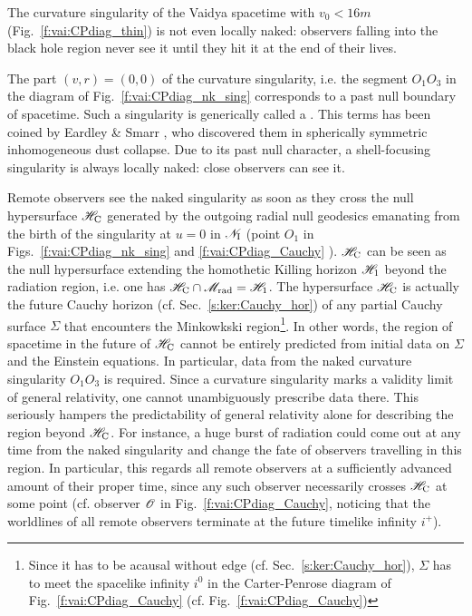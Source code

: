 \begin{remark}
The curvature singularity of the Vaidya spacetime with $v_0 < 16 m$ (Fig.~\ref{f:vai:CPdiag_thin})
is not even locally naked: observers falling into the black hole region never see
it until they hit it at the end of their lives.
\end{remark}

The part  $(v, r) = (0, 0)$ of the curvature singularity, i.e. the segment $O_1 O_3$ in
the diagram of Fig.~\ref{f:vai:CPdiag_nk_sing} corresponds to a past null boundary of
spacetime.
Such a singularity is generically called a
. This terms has been coined by Eardley \& Smarr \cite{EardlS79}, who discovered them
in spherically symmetric inhomogeneous dust collapse.
Due to its past null character, a shell-focusing singularity is always locally naked: close observers can see it.



Remote observers see the naked singularity as soon as they cross
the null hypersurface $\mathscr{H}_{\rm C}$ generated by the outgoing radial null geodesics
emanating from the birth of the singularity at $u=0$ in $\mathscr{N}_{\rm I}$
(point $O_1$ in Figs.~\ref{f:vai:CPdiag_nk_sing} and \ref{f:vai:CPdiag_Cauchy} ).
$\mathscr{H}_{\rm C}$ can be seen as the null hypersurface extending the
homothetic Killing horizon $\mathscr{H}_1$ beyond the radiation region, i.e. one has
$\mathscr{H}_{\rm C} \cap \mathscr{M}_{\rm rad} = \mathscr{H}_1$.
The hypersurface $\mathscr{H}_{\rm C}$ is actually the future Cauchy horizon (cf. Sec.~\ref{s:ker:Cauchy_hor})
of any partial Cauchy surface $\Sigma$ that encounters the Minkowkski region\footnote{Since it
has to be acausal without edge (cf. Sec.~\ref{s:ker:Cauchy_hor}), $\Sigma$ has to meet the spacelike infinity $i^0$
in the Carter-Penrose diagram of Fig.~\ref{f:vai:CPdiag_Cauchy} (cf. Fig.~\ref{f:vai:CPdiag_Cauchy})}.
In other words, the region of spacetime in the future of $\mathscr{H}_{\rm C}$ cannot
be entirely predicted from initial data on $\Sigma$ and the Einstein equations.
In particular, data from the naked curvature singularity $O_1 O_3$ is required.
Since a curvature singularity marks a validity limit of general relativity,
one cannot unambiguously prescribe data there. This seriously hampers the
predictability of general relativity alone for describing the region
beyond $\mathscr{H}_{\rm C}$. For instance, a huge burst of radiation could come
out at any time from the naked singularity and change the fate of observers
travelling in this region. In particular, this regards all remote observers at a sufficiently
advanced amount of their proper time, since any such observer necessarily crosses
$\mathscr{H}_{\rm C}$ at some point (cf. observer $\mathscr{O}$ in Fig.~\ref{f:vai:CPdiag_Cauchy},
noticing that the worldlines of all remote observers
terminate at the future timelike infinity $i^+$).



